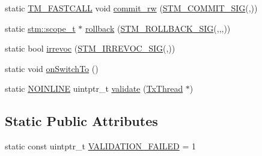 \begin{DoxyCompactItemize}
\item 
static \hyperlink{platform_8hpp_a8b5d728e6eed8f368f9966f637d2f719}{T\-M\-\_\-\-F\-A\-S\-T\-C\-A\-L\-L} void \hyperlink{structanonymous__namespace_02norecprio_8cpp_03_1_1NOrecPrio_a6c4ed60a3a793e3c1b6cdff33b89e294}{commit\-\_\-rw} (\hyperlink{include_2stm_2macros_8hpp_a1b8304eb1082517c7dc31f3534b72343}{S\-T\-M\-\_\-\-C\-O\-M\-M\-I\-T\-\_\-\-S\-I\-G}(,))
\item 
static \hyperlink{namespacestm_a91badf88c88aacc831b01a315435a255}{stm\-::scope\-\_\-t} $\ast$ \hyperlink{structanonymous__namespace_02norecprio_8cpp_03_1_1NOrecPrio_a29f55c5e2493ec0033a66ab4e6bb81cf}{rollback} (\hyperlink{include_2stm_2macros_8hpp_a1c36a48149c84f90d5bca01019950ca9}{S\-T\-M\-\_\-\-R\-O\-L\-L\-B\-A\-C\-K\-\_\-\-S\-I\-G}(,,,))
\item 
static bool \hyperlink{structanonymous__namespace_02norecprio_8cpp_03_1_1NOrecPrio_a0abc45158ebe6b259f291c34dfdf219b}{irrevoc} (\hyperlink{include_2stm_2macros_8hpp_acf117c2df6442342f6603e1a12fa3b5c}{S\-T\-M\-\_\-\-I\-R\-R\-E\-V\-O\-C\-\_\-\-S\-I\-G}(,))
\item 
static void \hyperlink{structanonymous__namespace_02norecprio_8cpp_03_1_1NOrecPrio_a45a11190e6e10c325acb4f0dd9f41373}{on\-Switch\-To} ()
\item 
static \hyperlink{platform_8hpp_a1b173d22e57d9395897acbd8de62d505}{N\-O\-I\-N\-L\-I\-N\-E} uintptr\-\_\-t \hyperlink{structanonymous__namespace_02norecprio_8cpp_03_1_1NOrecPrio_a410ecf80cf543ecb6451243f91059cab}{validate} (\hyperlink{structstm_1_1TxThread}{Tx\-Thread} $\ast$)
\end{DoxyCompactItemize}
\subsection*{Static Public Attributes}
\begin{DoxyCompactItemize}
\item 
static const uintptr\-\_\-t \hyperlink{structanonymous__namespace_02norecprio_8cpp_03_1_1NOrecPrio_a755ce483e4f10ae87b120a26686320ed}{V\-A\-L\-I\-D\-A\-T\-I\-O\-N\-\_\-\-F\-A\-I\-L\-E\-D} = 1
\end{DoxyCompactItemize}


